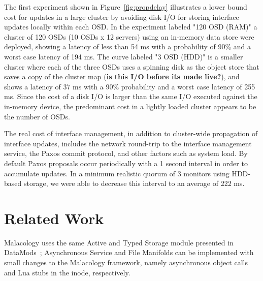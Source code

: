 \documentclass[10pt,twocolumn]{article}
\begin{document}
The first experiment shown in Figure~\ref{fig:propdelay} illustrates a lower
bound cost for updates in a large cluster by avoiding disk I/O for storing
interface updates locally within each OSD.  In the experiment labeled "120 OSD
(RAM)" a cluster of 120 OSDs (10 OSDs x 12 servers) using an in-memory data
store were deployed, showing a latency of less than 54 ms with a probability of
90\% and a worst case latency of 194 ms. The curve labeled "3 OSD (HDD)" is a
smaller cluster where each of the three OSDs uses a spinning disk as the object
store that saves a copy of the cluster map ({\bf is this I/O before its made
live?}), and shows a latency of 37 ms with a 90\% probability and a worst case
latency of 255 ms. Since the cost of a disk I/O is larger than the same I/O
executed against the in-memory device, the predominant cost in a lightly loaded
cluster appears to be the number of OSDs.

The real cost of interface management, in addition to cluster-wide propagation
of interface updates, includes the network round-trip to the interface
management service, the Paxos commit protocol, and other factors such as system
load. By default Paxos proposals occur periodically with a 1 second interval in
order to accumulate updates. In a minimum realistic quorum of 3 monitors using
HDD-based storage, we were able to decrease this interval to an average of 222
ms.

%
%
%

\section{Related Work}

Malacology uses the same Active and Typed Storage module presented in
DataMods~\cite{watkins_datamods_2012}; Asynchronous Service and File
Manifolds can be implemented with small changes to the Malacology
framework, namely asynchronous object calls and Lua stubs in the inode,
respectively.
\end{document}
